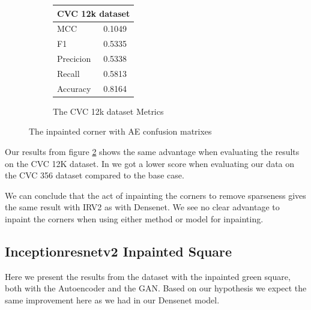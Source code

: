 \begin{figure}[h]
\begin{subfigure}[b]{0.25\textwidth}
        \begin{tabular}{ll}
        \toprule
        \multicolumn{2}{c}{CVC 12k dataset}        \\
        \midrule
        MCC 		& 0.1049 \\
        F1  		& 0.5335 \\
        Precicion  	& 0.5338 \\
        Recall     	& 0.5813 \\
        Accuracy	& 0.8164 \\
        \bottomrule
        \end{tabular}
\caption{The CVC 12k dataset Metrics}
\label{tab:cvc12k_metrics_IRV2_AE_CORNER}
\end{subfigure}
\caption{The inpainted corner with AE confusion matrixes}
\label{fig:results_IRV2_AE_CORNER}
\end{figure}
\FloatBarrier

Our results from figure \ref{fig:results_IRV2_AE_CORNER} shows the same advantage when evaluating the results on the CVC 12K dataset.
In we got a lower score when evaluating our data on the CVC 356 dataset compared to the base case.

We can conclude that the act of inpainting the corners to remove sparseness gives the same result with IRV2 as with Densenet.
We see no clear advantage to inpaint the corners when using either method or model for inpainting.







\subsection{Inceptionresnetv2 Inpainted Square}

Here we present the results from the dataset with the inpainted green square, both with the Autoencoder and the GAN.  
Based on our hypothesis we expect the same improvement here as we had in our Densenet model.  
 

